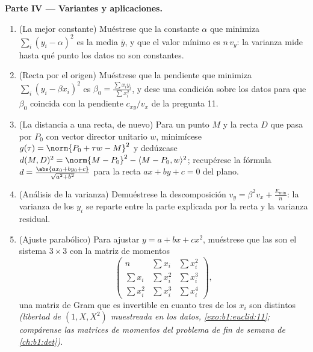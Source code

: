 \begin{problem}
\medskip
\noindent\textbf{Parte IV --- Variantes y aplicaciones.}
\begin{enumerate}[resume]
  \item (La mejor constante) Muéstrese que la constante $\alpha$
        que minimiza $\sum_i (y_i - \alpha)^2$ es la media $\bar
        y$, y que el valor mínimo es $n\,v_y$: la varianza
        mide hasta qué punto los datos no son constantes.
  \item (Recta por el origen) Muéstrese que la pendiente que minimiza
        $\sum_i (y_i - \beta x_i)^2$ es $\beta_0 = \frac{\sum
        x_iy_i}{\sum x_i^2}$, y dese una condición sobre los datos
        para que $\beta_0$ coincida con la pendiente
        $c_{xy}/v_x$ de la pregunta 11.
  \item (La distancia a una recta, de nuevo) Para un punto $M$ y la recta
        $D$ que pasa por $P_0$ con vector director unitario $w$,
        minimícese $g(\tau) = \norm{P_0 + \tau w - M}^2$ y
        dedúzcase $d(M, D)^2 = \norm{M - P_0}^2 - \langle M - P_0,
        w\rangle^2$; recupérese la fórmula $d = \frac{\abs{a x_0 +
        b y_0 + c}}{\sqrt{a^2 + b^2}}$ para la recta $ax + by + c
        = 0$ del plano.
  \item (Análisis de la varianza) Demuéstrese la descomposición $v_y =
        \beta^2 v_x + \frac{E_{\min}}n$: la varianza de los
        $y_i$ se reparte entre la parte explicada por la recta y
        la varianza residual.
  \item (Ajuste parabólico) Para ajustar $y = a + bx + cx^2$, muéstrese que
        las  son el sistema $3 \times 3$ con
        la matriz de momentos
        \[
        \begin{pmatrix}
        n & \sum x_i & \sum x_i^2\\
        \sum x_i & \sum x_i^2 & \sum x_i^3\\
        \sum x_i^2 & \sum x_i^3 & \sum x_i^4
        \end{pmatrix},
        \]
        una matriz de Gram que es invertible en cuanto tres de
        los $x_i$ son distintos \emph{(libertad de $(1, X, X^2)$
        muestreada en los datos, \cref{exo:b1:euclid:11}; compárense
        las matrices de momentos del problema de fin de semana de
        \cref{ch:b1:det})}.
\end{enumerate}


\end{problem}
